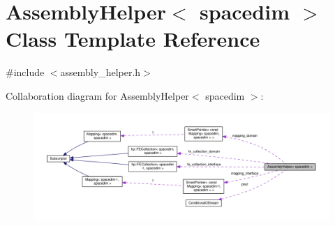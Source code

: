 \hypertarget{class_assembly_helper}{}\section{Assembly\+Helper$<$ spacedim $>$ Class Template Reference}
\label{class_assembly_helper}


{\ttfamily \#include $<$assembly\+\_\+helper.\+h$>$}



Collaboration diagram for Assembly\+Helper$<$ spacedim $>$\+:\nopagebreak
\begin{figure}[H]
\begin{center}
\leavevmode
\includegraphics[width=350pt]{class_assembly_helper__coll__graph}
\end{center}
\end{figure}
